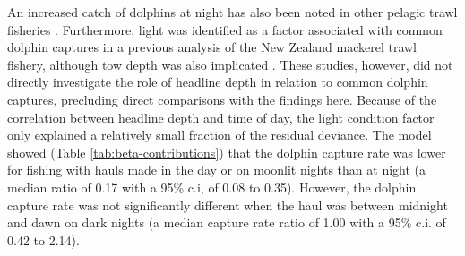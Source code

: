 \documentclass[10pt]{article}
\begin{document}
An increased catch of dolphins at night has also been noted in other
pelagic trawl fisheries \cite{crespo_direct_1997,
morizur_incidental_1999, fernandez_incidental_2010,
boer_interactions_2012}. Furthermore, light was identified as a factor
associated with common dolphin captures in a previous analysis of the
New Zealand mackerel trawl fishery, although tow depth was also implicated \cite{fresne_factors_2007}.  These studies, however, did not directly investigate the role of headline depth in relation to common dolphin captures, precluding direct comparisons with the findings here.  Because of the correlation between headline depth and time of day, the light condition factor only explained a relatively small fraction of the residual deviance. 
The model showed (Table \ref{tab:beta-contributions}) that the dolphin capture rate was lower for fishing with hauls made in the day or on moonlit nights than at night (a median ratio of 0.17 with a 95\% c.i, of 0.08 to 0.35). However, the dolphin capture rate was not significantly different when the haul was between midnight and dawn on dark nights (a median capture rate ratio of 1.00 with a 95\% c.i. of 0.42 to 2.14).  
\end{document}
